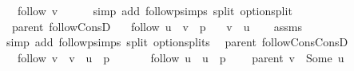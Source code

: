 \begin{isabellebody}
\ \ \ {\isachardoublequoteopen}follow\ v\ {\isasymnoteq}\ {\isacharbrackleft}{\kern0pt}{\isacharbrackright}{\kern0pt}{\isachardoublequoteclose}%
\endisataginvisible
{\isafoldinvisible}%
%
\isadeliminvisible
\isanewline
%
\endisadeliminvisible
%
\isadelimproof
\ \ %
\endisadelimproof
%
\isatagproof
{}\isamarkupfalse%
\ {\isacharparenleft}{\kern0pt}simp\ add{\isacharcolon}{\kern0pt}\ follow{\isacharunderscore}{\kern0pt}psimps\ split{\isacharcolon}{\kern0pt}\ option{\isachardot}{\kern0pt}split{\isacharparenright}{\kern0pt}%
\endisatagproof
{\isafoldproof}%
%
\isadelimproof
\isanewline
%
\endisadelimproof
%
\isadeliminvisible
\isanewline
%
\endisadeliminvisible
%
\isataginvisible
{}\isamarkupfalse%
\ {\isacharparenleft}{\kern0pt}\ parent{\isacharparenright}{\kern0pt}\ follow{\isacharunderscore}{\kern0pt}ConsD{\isacharcolon}{\kern0pt}\isanewline
\ \ \ {\isachardoublequoteopen}follow\ u\ {\isacharequal}{\kern0pt}\ v\ {\isacharhash}{\kern0pt}\ p{\isachardoublequoteclose}\isanewline
\ \ \ {\isachardoublequoteopen}v\ {\isacharequal}{\kern0pt}\ u{\isachardoublequoteclose}%
\endisataginvisible
{\isafoldinvisible}%
%
\isadeliminvisible
\isanewline
%
\endisadeliminvisible
%
\isadelimproof
\ \ %
\endisadelimproof
%
\isatagproof
{}\isamarkupfalse%
\ assms\isanewline
\ \ \isamarkupfalse%
\ {\isacharparenleft}{\kern0pt}simp\ add{\isacharcolon}{\kern0pt}\ follow{\isacharunderscore}{\kern0pt}psimps\ split{\isacharcolon}{\kern0pt}\ option{\isachardot}{\kern0pt}splits{\isacharparenleft}{\kern0pt}{}{\isacharparenright}{\kern0pt}{\isacharparenright}{\kern0pt}%
\endisatagproof
{\isafoldproof}%
%
\isadelimproof
\isanewline
%
\endisadelimproof
%
\isadeliminvisible
\isanewline
%
\endisadeliminvisible
%
\isataginvisible
{}\isamarkupfalse%
\ {\isacharparenleft}{\kern0pt}\ parent{\isacharparenright}{\kern0pt}\ follow{\isacharunderscore}{\kern0pt}Cons{\isacharunderscore}{\kern0pt}ConsD{\isacharcolon}{\kern0pt}\isanewline
\ \ \ {\isachardoublequoteopen}follow\ v\ {\isacharequal}{\kern0pt}\ v\ {\isacharhash}{\kern0pt}\ u\ {\isacharhash}{\kern0pt}\ p{\isachardoublequoteclose}\isanewline
\ \ \isanewline
\ \ \ \ {\isachardoublequoteopen}follow\ u\ {\isacharequal}{\kern0pt}\ u\ {\isacharhash}{\kern0pt}\ p{\isachardoublequoteclose}\isanewline
\ \ \ \ {\isachardoublequoteopen}parent\ v\ {\isacharequal}{\kern0pt}\ Some\ u{\isachardoublequoteclose}%
\endisataginvisible
{\isafoldinvisible}%

\end{isabellebody}
